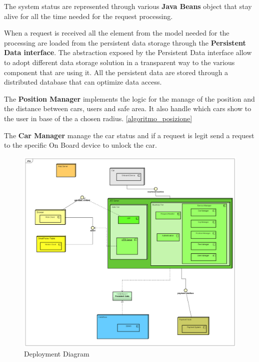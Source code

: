 The system status are represented through various \textbf{Java Beans} object that stay alive for all the time needed for the request processing.


When a request is received all the element from the model needed for the processing are loaded from the persistent data storage through the \textbf{Persistent Data interface}. The abstraction exposed by the Persistent Data interface allow to adopt different data storage solution in a transparent way to the various component that are using it. All the persistent data are stored through a distributed database that can optimize data access.

The \textbf{Position Manager} implements the logic for the manage of the position and the distance between cars, users and safe area. It also handle which cars show to the user in base of the a chosen radius. \ref{algoritmo_posizione}

The \textbf{Car Manager} manage the car status and if a request is legit send a request to the specific On Board device to unlock the car.



\begin{figure}[H]	
	\centering
	\includegraphics[width=\textwidth]{img/deployment_diagram}
	\caption{Deployment Diagram}
\end{figure}

\newpage

